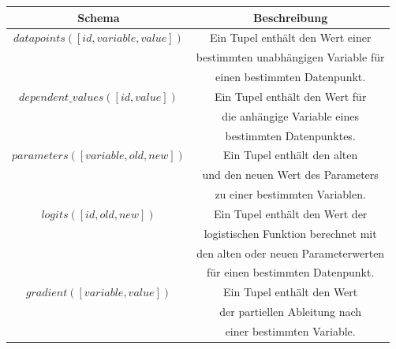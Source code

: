 \begin{center}
  \begin{tabular}{|c|c|}\hline
    \textbf{Schema} & \textbf{Beschreibung} \\ \hline
    $datapoints([id, variable, value])$ & Ein Tupel enthält den Wert einer \\
    & bestimmten unabhängigen Variable für \\
    & einen bestimmten Datenpunkt. \\ \hline
    $dependent\_values([id, value])$ & Ein Tupel enthält den Wert für \\
    & die anhängige Variable eines \\
    & bestimmten Datenpunktes. \\ \hline
    $parameters([variable, old, new])$ & Ein Tupel enthält den alten \\
    & und den neuen Wert des Parameters \\
    & zu einer bestimmten Variablen. \\ \hline
    $logits([id, old, new])$ & Ein Tupel enthält den Wert der \\
    & logistischen Funktion berechnet mit \\
    & den alten oder neuen Parameterwerten \\
    & für einen bestimmten Datenpunkt. \\ \hline
    $gradient([variable, value])$ & Ein Tupel enthält den Wert \\
    & der partiellen Ableitung nach \\
    & einer bestimmten Variable. \\ \hline
  \end{tabular}
\end{center}


